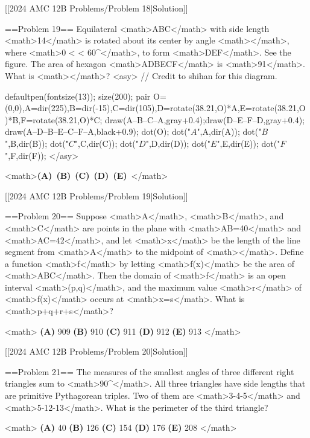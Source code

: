 [[2024 AMC 12B Problems/Problem 18|Solution]]

==Problem 19==
Equilateral <math>\triangle ABC</math> with side length <math>14</math> is rotated about its center by angle <math>\theta</math>, where <math>0 < \theta < 60^{\circ}</math>, to form <math>\triangle DEF</math>. See the figure. The area of hexagon <math>ADBECF</math> is <math>91</math>. What is <math>\tan\theta</math>?
<asy>
// Credit to shihan for this diagram.

defaultpen(fontsize(13)); size(200);
pair O=(0,0),A=dir(225),B=dir(-15),C=dir(105),D=rotate(38.21,O)*A,E=rotate(38.21,O)*B,F=rotate(38.21,O)*C;
draw(A--B--C--A,gray+0.4);draw(D--E--F--D,gray+0.4); draw(A--D--B--E--C--F--A,black+0.9); dot(O); dot("$A$",A,dir(A)); dot("$B$",B,dir(B)); dot("$C$",C,dir(C)); dot("$D$",D,dir(D)); dot("$E$",E,dir(E)); dot("$F$",F,dir(F));
</asy>

<math>\textbf{(A)}~\qquad\textbf{(B)}~\qquad\textbf{(C)}~\qquad\textbf{(D)}~\qquad\textbf{(E)}~</math>

[[2024 AMC 12B Problems/Problem 19|Solution]]

==Problem 20==
Suppose <math>A</math>, <math>B</math>, and <math>C</math> are points in the plane with <math>AB=40</math> and <math>AC=42</math>, and let <math>x</math> be the length of the line segment from <math>A</math> to the midpoint of <math></math>. Define a function <math>f</math> by letting <math>f(x)</math> be the area of <math>\triangle ABC</math>. Then the domain of <math>f</math> is an open interval <math>(p,q)</math>, and the maximum value <math>r</math> of <math>f(x)</math> occurs at <math>x=s</math>. What is <math>p+q+r+s</math>?

<math>
\textbf{(A) }909\qquad
\textbf{(B) }910\qquad
\textbf{(C) }911\qquad
\textbf{(D) }912\qquad
\textbf{(E) }913\qquad
</math>

[[2024 AMC 12B Problems/Problem 20|Solution]]

==Problem 21==
The measures of the smallest angles of three different right triangles sum to <math>90^\circ</math>. All three triangles have side lengths that are primitive Pythagorean triples. Two of them are <math>3-4-5</math> and <math>5-12-13</math>. What is the perimeter of the third triangle?

<math>
\textbf{(A) }40 \qquad
\textbf{(B) }126 \qquad
\textbf{(C) }154 \qquad
\textbf{(D) }176 \qquad
\textbf{(E) }208 \qquad
</math>

